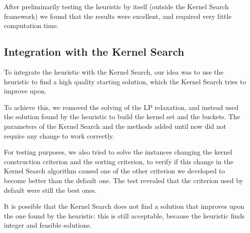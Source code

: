 After preliminarily testing the heuristic by itself (outside the Kernel Search framework)
we found that the results were excellent, and required very little computation time.

\subsection{Integration with the Kernel Search}
To integrate the heuristic with the Kernel Search, our idea was to use the heuristic
to find a high quality starting solution, which the Kernel Search tries to improve upon.

To achieve this, we removed the solving of the LP relaxation, and instead
used the solution found by the heuristic to build the kernel set and the buckets.
The parameters of the Kernel Search and the methods added until now
did not require any change to work correctly.

For testing purposes, we also tried to solve the instances changing the kernel construction
criterion and the sorting criterion, to verify if this change in the
Kernel Search algorithm caused one of the other criterion we developed
to become better than the default one.
The test revealed that the criterion used by default were still the best ones.

It is possible that the Kernel Search does not find a solution that improves
upon the one found by the heuristic: this is still acceptable, because the
heuristic finds integer and feasible solutions.


